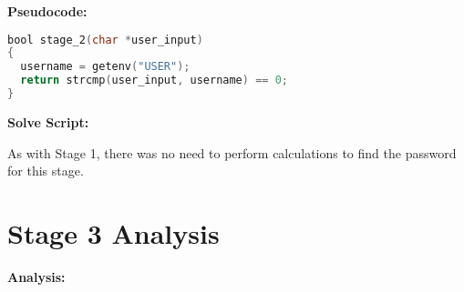\documentclass{article}
\begin{document}
\begin{flushleft}
\textbf{Pseudocode:}
\vspace{.5pc}
\end{flushleft}
\begin{lstlisting}[language=C]
bool stage_2(char *user_input)
{
  username = getenv("USER");
  return strcmp(user_input, username) == 0;
}
\end{lstlisting}

\begin{flushleft}
\textbf{Solve Script:}
\vspace{.5pc}
\end{flushleft}
\par
As with Stage 1, there was no need to perform calculations to find the 
password for this stage.

\newpage
\section{Stage 3 Analysis}
\begin{flushleft}
\vspace{.5pc}
\end{flushleft}

\begin{flushleft}
\textbf{Analysis:}
\vspace{.5pc}
\end{flushleft}
\end{document}
